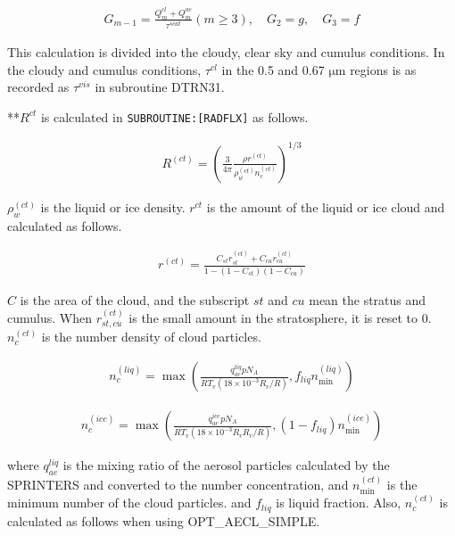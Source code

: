 \begin{eqnarray}
G_{m-1}=\frac{Q_{m}^{c l}+Q_{m}^{ae}}{\tau^{s c a t}}(m \geq 3), \quad G_{2}=g, \quad G_{3}=f
\end{eqnarray}

This calculation is divided into the cloudy, clear sky and cumulus conditions. In the cloudy and cumulus conditions, \(\tau^{cl}\) in the 0.5 and 0.67 \(\mathrm{{\mu}m}\) regions is as recorded as
\(\tau^{vis}\) in subroutine DTRN31.

**\(R^{ct}\) is calculated in \texttt{SUBROUTINE:{[}RADFLX{]}} as follows.

\begin{eqnarray}
R^{(c t)}=\left(\frac{3}{4 \pi} \frac{\rho r^{(c t)}}{\rho_{w}^{(c t)} n_{c}^{(c t)}}\right)^{1 / 3}
\end{eqnarray}

\(\rho_{w}^{(c t)}\) is the liquid or ice density. \(r^{ct}\) is the amount of the liquid or ice cloud and calculated as follows.

\begin{eqnarray}
r^{(c t)}=\frac{C_{s t} r_{s t}^{(c t)}+C_{c u} r_{c u}^{(c t)}}{1-\left(1-C_{s t}\right)\left(1-C_{c u}\right)}
\end{eqnarray}

\(C\) is the area of the cloud, and the subscript \(st\) and \(cu\) mean the stratus and cumulus. When \(r_{s t, c u}^{(c t)}\) is the small amount in the stratosphere, it is reset to 0.
\(n_{c}^{(c t)}\) is the number density of cloud particles.

\begin{eqnarray}
n_{c}^{(l i q)}=\max \left(\frac{q_{a e}^{l i q} p N_{A}}{R T_{v}\left(18 \times 10^{-3} R_{v} / R\right)}, f_{l i q} n_{\min }^{(l i q)}\right)
\end{eqnarray}

\begin{eqnarray}
n_{c}^{(i c e)}=\max \left(\frac{q_{a e}^{i c e} p N_{A}}{R T_{v}\left(18 \times 10^{-3} R_{v} R_{v} / R\right)},\left(1-f_{l i q}\right) n_{\min }^{(i c e)}\right)
\end{eqnarray}

where \(q_{a e}^{l i q}\) is the mixing ratio of the aerosol particles calculated by the SPRINTERS and converted to the number concentration, and \(n_{\min }^{(c t)}\) is the minimum number of the
cloud particles. and \(f_{liq}\) is liquid fraction. Also, \(n_{c}^{(c t)}\) is calculated as follows when using OPT\_AECL\_SIMPLE.

